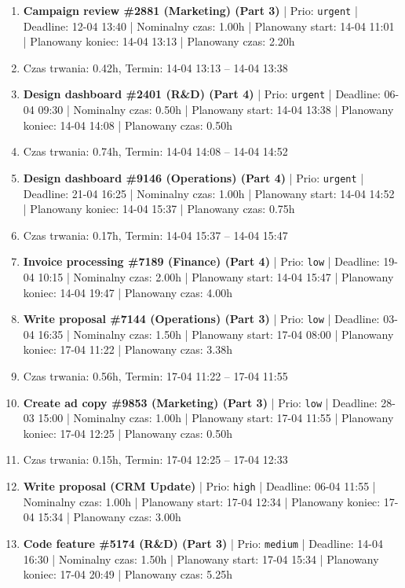 {\begin{enumerate}
  \item [\textbf{14599}] \textbf{Campaign review \#2881 (Marketing) (Part 3)} | Prio: \texttt{urgent} | Deadline: 12-04 13:40 | Nominalny czas: 1.00h | Planowany start: 14-04 11:01 | Planowany koniec: 14-04 13:13 | Planowany czas: 2.20h
  \item [\textbf{PRZERWA}] Czas trwania: 0.42h, Termin: 14-04 13:13 -- 14-04 13:38
  \item [\textbf{14603}] \textbf{Design dashboard \#2401 (R\&D) (Part 4)} | Prio: \texttt{urgent} | Deadline: 06-04 09:30 | Nominalny czas: 0.50h | Planowany start: 14-04 13:38 | Planowany koniec: 14-04 14:08 | Planowany czas: 0.50h
  \item [\textbf{PRZERWA}] Czas trwania: 0.74h, Termin: 14-04 14:08 -- 14-04 14:52
  \item [\textbf{14606}] \textbf{Design dashboard \#9146 (Operations) (Part 4)} | Prio: \texttt{urgent} | Deadline: 21-04 16:25 | Nominalny czas: 1.00h | Planowany start: 14-04 14:52 | Planowany koniec: 14-04 15:37 | Planowany czas: 0.75h
  \item [\textbf{PRZERWA}] Czas trwania: 0.17h, Termin: 14-04 15:37 -- 14-04 15:47
  \item [\textbf{14678}] \textbf{Invoice processing \#7189 (Finance) (Part 4)} | Prio: \texttt{low} | Deadline: 19-04 10:15 | Nominalny czas: 2.00h | Planowany start: 14-04 15:47 | Planowany koniec: 14-04 19:47 | Planowany czas: 4.00h
  \item [\textbf{14702}] \textbf{Write proposal \#7144 (Operations) (Part 3)} | Prio: \texttt{low} | Deadline: 03-04 16:35 | Nominalny czas: 1.50h | Planowany start: 17-04 08:00 | Planowany koniec: 17-04 11:22 | Planowany czas: 3.38h
  \item [\textbf{PRZERWA}] Czas trwania: 0.56h, Termin: 17-04 11:22 -- 17-04 11:55
  \item [\textbf{14679}] \textbf{Create ad copy \#9853 (Marketing) (Part 3)} | Prio: \texttt{low} | Deadline: 28-03 15:00 | Nominalny czas: 1.00h | Planowany start: 17-04 11:55 | Planowany koniec: 17-04 12:25 | Planowany czas: 0.50h
  \item [\textbf{PRZERWA}] Czas trwania: 0.15h, Termin: 17-04 12:25 -- 17-04 12:33
  \item [\textbf{14629}] \textbf{Write proposal (CRM Update)} | Prio: \texttt{high} | Deadline: 06-04 11:55 | Nominalny czas: 1.00h | Planowany start: 17-04 12:34 | Planowany koniec: 17-04 15:34 | Planowany czas: 3.00h
  \item [\textbf{14646}] \textbf{Code feature \#5174 (R\&D) (Part 3)} | Prio: \texttt{medium} | Deadline: 14-04 16:30 | Nominalny czas: 1.50h | Planowany start: 17-04 15:34 | Planowany koniec: 17-04 20:49 | Planowany czas: 5.25h

\end{enumerate}}
